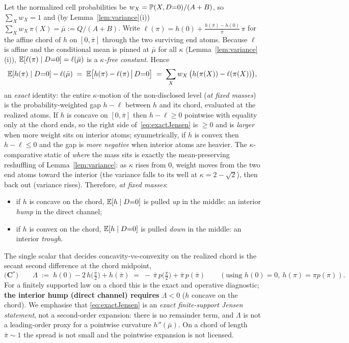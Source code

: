 \begin{remark}
Let the normalized cell probabilities be $w_X=\mathbb{P}(X,D{=}0)/(A+B)$, so
$\sum_X w_X=1$ and (by Lemma~\ref{lem:variance}(i)) $\sum_X w_X\,\pi(X)=\bar\mu:=Q/(A+B)$.
Write $\ell(\pi)=h(0)+\tfrac{h(\bar\pi)-h(0)}{\bar\pi}\,\pi$ for the affine chord of
$h$ on $[0,\bar\pi]$ through the two surviving end atoms. Because $\ell$ is affine and
the conditional mean is pinned at $\bar\mu$ for all $\kappa$ (Lemma~\ref{lem:variance}(i)),
$\mathbb{E}[\ell(\pi)\mid D{=}0]=\ell(\bar\mu)$ is a \emph{$\kappa$-free constant}. Hence
\begin{equation}\label{eq:exactJensen}
   \mathbb{E}[h(\pi)\mid D{=}0]-\ell(\bar\mu)
   \;=\;\mathbb{E}\bigl[h(\pi)-\ell(\pi)\,\big|\,D{=}0\bigr]
   \;=\;\sum_{X} w_X\,\bigl(h(\pi(X))-\ell(\pi(X))\bigr),
\end{equation}
an \emph{exact} identity: the entire $\kappa$-motion of the non-disclosed level
(\emph{at fixed masses}) is the probability-weighted gap $h-\ell$ between $h$ and
its chord, evaluated at the realized atoms. If $h$ is concave on $[0,\bar\pi]$ then
$h-\ell\ge0$ pointwise with equality only at the chord ends, so the right side
of~\eqref{eq:exactJensen} is $\ge0$ and is \emph{larger} when more weight sits on
interior atoms; symmetrically, if $h$ is convex then $h-\ell\le0$ and the gap is
\emph{more negative} when interior atoms are heavier. The $\kappa$-comparative
static of \emph{where} the mass sits is exactly the mean-preserving reshuffling of
Lemma~\ref{lem:variance}: as $\kappa$ rises from $0$, weight moves from the two end
atoms toward the interior (the variance falls to its well at $\kappa=2-\sqrt2$),
then back out (variance rises). Therefore, \emph{at fixed masses}:
\begin{itemize}
   \item if $h$ is concave on the chord, $\mathbb{E}[h\mid D{=}0]$ is pulled \emph{up} in the
   middle: an interior \emph{hump} in the direct channel;
   \item if $h$ is convex on the chord, $\mathbb{E}[h\mid D{=}0]$ is pulled \emph{down} in the
   middle: an interior \emph{trough}.
\end{itemize}
The single scalar that decides concavity-vs-convexity on the realized chord is the
secant second difference at the chord midpoint,
\begin{equation}\label{eq:Cstar}
   \textbf{(C$^\ast$)}\qquad
   \Lambda\;:=\;h(0)-2\,h\!\bigl(\tfrac{\bar\pi}{2}\bigr)+h(\bar\pi)
   \;=\;-\,\bar\pi\,p\!\bigl(\tfrac{\bar\pi}{2}\bigr)+\bar\pi\,p(\bar\pi)
   \qquad(\text{using }h(0)=0,\ h(\pi)=\pi p(\pi)) .
\end{equation}
For a finitely supported law on a chord this is the exact and operative diagnostic;
\textbf{the interior hump (direct channel) requires $\Lambda<0$} ($h$ concave on
the chord). We emphasise that \eqref{eq:exactJensen} is an \emph{exact
finite-support Jensen statement}, not a second-order expansion: there is no
remainder term, and $\Lambda$ is not a leading-order proxy for a pointwise
curvature $h''(\bar\mu)$. On a chord of length $\bar\pi\sim1$ the spread is not
small and the pointwise expansion is not licensed.


\end{remark}
